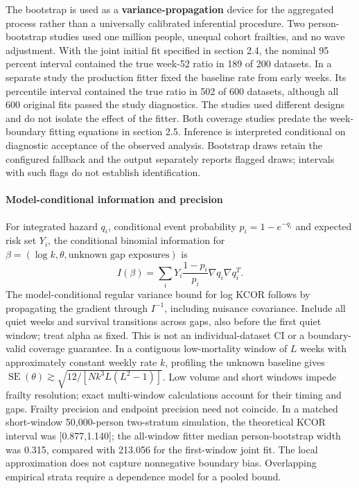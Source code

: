 \documentclass[
]{article}
\begin{document}
The bootstrap is used as a \textbf{variance-propagation} device for the aggregated process rather than a universally calibrated inferential procedure. Two person-bootstrap studies used one million people, unequal cohort frailties, and no wave adjustment. With the joint initial fit specified in section 2.4, the nominal 95 percent interval contained the true week-52 ratio in 189 of 200 datasets. In a separate study the production fitter fixed the baseline rate from early weeks. Its percentile interval contained the true ratio in 502 of 600 datasets, although all 600 original fits passed the study diagnostics. The studies used different designs and do not isolate the effect of the fitter. Both coverage studies predate the week-boundary fitting equations in section 2.5. Inference is interpreted conditional on diagnostic acceptance of the observed analysis. Bootstrap draws retain the configured fallback and the output separately reports flagged draws; intervals with such flags do not establish identification.

\paragraph{Model-conditional information and precision}\label{model-conditional-information-and-precision}

For integrated hazard \(q_i\), conditional event probability \(p_i=1-e^{-q_i}\) and expected risk set \(Y_i\), the conditional binomial information for \(\beta=(\log k,\theta,\text{unknown gap exposures})\) is \[I(\beta)=\sum_i Y_i\frac{1-p_i}{p_i}\nabla q_i\nabla q_i^T.\] The model-conditional regular variance bound for log KCOR follows by propagating the gradient through \(I^{-1}\), including nuisance covariance. Include all quiet weeks and survival transitions across gaps, also before the first quiet window; treat alpha as fixed. This is not an individual-dataset CI or a boundary-valid coverage guarantee. In a contiguous low-mortality window of \(L\) weeks with approximately constant weekly rate \(k\), profiling the unknown baseline gives \(\operatorname{SE}(\theta)\gtrsim\sqrt{12/[Nk^3 L(L^2-1)]}\). Low volume and short windows impede frailty resolution; exact multi-window calculations account for their timing and gaps. Frailty precision and endpoint precision need not coincide. In a matched short-window 50,000-person two-stratum simulation, the theoretical KCOR interval was {[}0.877,1.140{]}; the all-window fitter median person-bootstrap width was 0.315, compared with 213.056 for the first-window joint fit. The local approximation does not capture nonnegative boundary bias. Overlapping empirical strata require a dependence model for a pooled bound.
\end{document}
